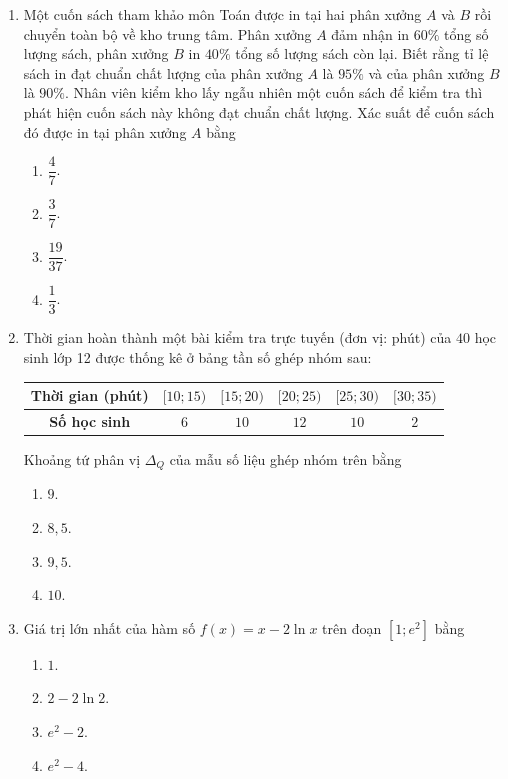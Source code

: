\documentclass[12pt,a4paper]{article}
\begin{document}
\begin{enumerate}[label=\textbf{Câu \arabic*:}, leftmargin=*]
\item Một cuốn sách tham khảo môn Toán được in tại hai phân xưởng $A$ và $B$ rồi chuyển toàn bộ về kho trung tâm. Phân xưởng $A$ đảm nhận in $60\%$ tổng số lượng sách, phân xưởng $B$ in $40\%$ tổng số lượng sách còn lại. Biết rằng tỉ lệ sách in đạt chuẩn chất lượng của phân xưởng $A$ là $95\%$ và của phân xưởng $B$ là $90\%$. Nhân viên kiểm kho lấy ngẫu nhiên một cuốn sách để kiểm tra thì phát hiện cuốn sách này không đạt chuẩn chất lượng. Xác suất để cuốn sách đó được in tại phân xưởng $A$ bằng
\begin{enumerate}[label=\Alph*.]
    \item $\dfrac{4}{7}$.
    \item $\dfrac{3}{7}$.
    \item $\dfrac{19}{37}$.
    \item $\dfrac{1}{3}$.
\end{enumerate}

\item Thời gian hoàn thành một bài kiểm tra trực tuyến (đơn vị: phút) của $40$ học sinh lớp 12 được thống kê ở bảng tần số ghép nhóm sau:
\begin{center}
\begin{tabular}{|c|c|c|c|c|c|}
\hline
\textbf{Thời gian (phút)} & $[10; 15)$ & $[15; 20)$ & $[20; 25)$ & $[25; 30)$ & $[30; 35)$ \\
\hline
\textbf{Số học sinh} & $6$ & $10$ & $12$ & $10$ & $2$ \\
\hline
\end{tabular}
\end{center}
Khoảng tứ phân vị $\Delta_Q$ của mẫu số liệu ghép nhóm trên bằng
\begin{enumerate}[label=\Alph*.]
    \item $9$.
    \item $8{,}5$.
    \item $9{,}5$.
    \item $10$.
\end{enumerate}

\item Giá trị lớn nhất của hàm số $f(x) = x - 2\ln x$ trên đoạn $[1; e^2]$ bằng
\begin{enumerate}[label=\Alph*.]
    \item $1$.
    \item $2 - 2\ln 2$.
    \item $e^2 - 2$.
    \item $e^2 - 4$.
\end{enumerate}


\end{enumerate}
\end{document}
